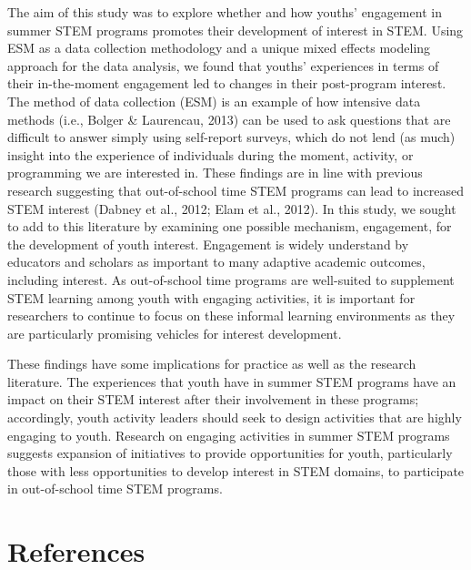 \documentclass[man]{apa6}
\theoremstyle{definition}
\theoremstyle{definition}
\theoremstyle{definition}
\theoremstyle{remark}
\begin{document}
The aim of this study was to explore whether and how youths' engagement
in summer STEM programs promotes their development of interest in STEM.
Using ESM as a data collection methodology and a unique mixed effects
modeling approach for the data analysis, we found that youths'
experiences in terms of their in-the-moment engagement led to changes in
their post-program interest. The method of data collection (ESM) is an
example of how intensive data methods (i.e., Bolger \& Laurencau, 2013)
can be used to ask questions that are difficult to answer simply using
self-report surveys, which do not lend (as much) insight into the
experience of individuals during the moment, activity, or programming we
are interested in. These findings are in line with previous research
suggesting that out-of-school time STEM programs can lead to increased
STEM interest (Dabney et al., 2012; Elam et al., 2012). In this study,
we sought to add to this literature by examining one possible mechanism,
engagement, for the development of youth interest. Engagement is widely
understand by educators and scholars as important to many adaptive
academic outcomes, including interest. As out-of-school time programs
are well-suited to supplement STEM learning among youth with engaging
activities, it is important for researchers to continue to focus on
these informal learning environments as they are particularly promising
vehicles for interest development.

These findings have some implications for practice as well as the
research literature. The experiences that youth have in summer STEM
programs have an impact on their STEM interest after their involvement
in these programs; accordingly, youth activity leaders should seek to
design activities that are highly engaging to youth. Research on
engaging activities in summer STEM programs suggests expansion of
initiatives to provide opportunities for youth, particularly those with
less opportunities to develop interest in STEM domains, to participate
in out-of-school time STEM programs.

\newpage

\section{References}\label{references}
\end{document}
